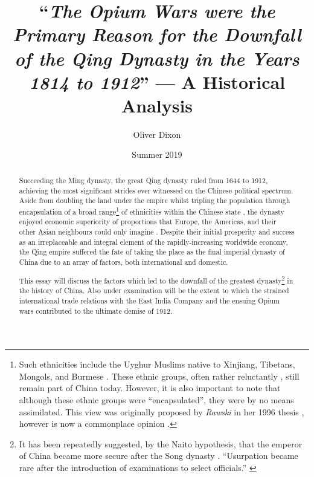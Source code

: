 \documentclass{article}
\title{``\emph{The Opium Wars were the Primary Reason for the Downfall of the Qing Dynasty in the Years 1814 to 1912}'' --- A Historical Analysis}
\author{Oliver Dixon}
\date{Summer 2019}
\begin{document}
\clearpage\maketitle
\thispagestyle{titlehdr}
\pagestyle{stdhdr}

\vspace*{-1.5em}
\begin{figure}[h!]
	\centering
        \def\svgwidth{0.5\linewidth}
	
\end{figure}
\vspace*{-0.5em}

\begin{abstract}

	Succeeding the Ming dynasty, the great Qing dynasty ruled from 1644 to 1912, achieving the most significant strides ever witnessed on the Chinese political spectrum. Aside from doubling the land under the empire \autocites{Turchin:2006}{Goldstone:1995} whilst tripling the population through encapsulation of a broad range\footnote{Such ethnicities include the Uyghur Muslims native to Xinjiang, Tibetans, Mongols, and Burmese \autocite{Chia:1993}. These ethnic groups, often rather reluctantly \autocites{Teichman:2002}{Smith:2009}{Dwyer:2005}, still remain part of China today. However, it is also important to note that although these ethnic groups were ``encapsulated'', they were by no means assimilated. This view was originally proposed by \textit{Rawski} in her 1996 thesis \autocite{Rawski:1996}, however is now a commonplace opinion \autocite{Hou:2014}.} of ethnicities within the Chinese state \autocite{Rowe:2012}, the dynasty enjoyed economic superiority of proportions that Europe, the Americas, and their other Asian neighbours could only imagine \autocite{Maddison:2007}. Despite their initial prosperity and success as an irreplaceable and integral element of the rapidly-increasing worldwide economy, the Qing empire suffered the fate of taking the place as the final imperial dynasty of China due to an array of factors, both international and domestic.

        This essay will discuss the factors which led to the downfall of the greatest dynasty\footnote{It has been repeatedly suggested, by the Naito hypothesis, that the emperor of China became more secure after the Song dynasty \autocite{Miyakawa:1955}. ``Usurpation became rare after the introduction of examinations to select officials.'' \autocite{Sng:2014}} in the history of China. Also under examination will be the extent to which the strained international trade relations with the East India Company and the ensuing Opium wars contributed to the ultimate demise of 1912.

\end{abstract}
\end{document}
